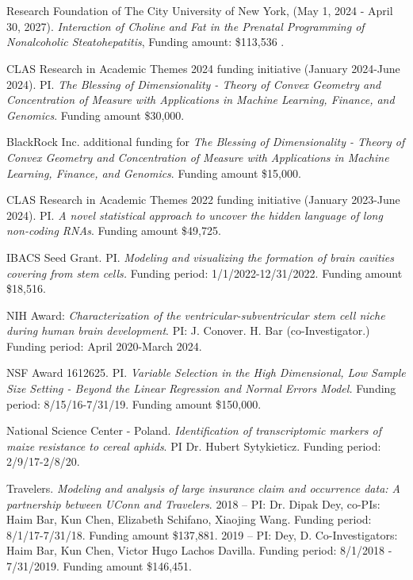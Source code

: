 \documentclass[12pt,a4paper]{article}
\newcommand{\headingfont}{\Large\color{OliveGreen}}
\newenvironment{list1}{
  \begin{list}{\ding{113}}{%
      \setlength{\itemsep}{0in}
      \setlength{\parsep}{0in} \setlength{\parskip}{0in}
      \setlength{\topsep}{0in} \setlength{\partopsep}{0in}
      \setlength{\leftmargin}{0.17in}}}{\end{list}}
\begin{document}
\section*{\sc{\headingfont Grants and Contracts}}
\begin{list1}
\item[-] Research Foundation of The City University of New York, (May 1, 2024 - April 30, 2027). \textit{Interaction of Choline and Fat in the Prenatal Programming of Nonalcoholic Steatohepatitis}, Funding amount: \$113,536 .
\item[-] CLAS Research in Academic Themes 2024 funding initiative (January 2024-June 2024). PI. \textit{The Blessing of Dimensionality - Theory of Convex Geometry and Concentration of Measure with Applications in Machine Learning, Finance, and Genomics}. Funding amount \$30,000.
\item[-] BlackRock Inc. additional funding for \textit{The Blessing of Dimensionality - Theory of Convex Geometry and Concentration of Measure with Applications in Machine Learning, Finance, and Genomics}. Funding amount \$15,000.

\item[-] CLAS Research in Academic Themes 2022 funding initiative (January 2023-June 2024). PI. \textit{A novel statistical approach to uncover the hidden language of long non-coding RNAs}. Funding amount \$49,725.
\item[-] IBACS Seed Grant. PI. \textit{Modeling and visualizing the formation of brain cavities covering from stem cells.} Funding period: 1/1/2022-12/31/2022. Funding amount \$18,516.
\item[-] NIH Award: \textit{Characterization of the ventricular-subventricular stem cell niche during human brain development}. 
PI: J. Conover. H. Bar (co-Investigator.) Funding period: April 2020-March 2024. %
\item[-] NSF Award  1612625. PI. \textit{Variable Selection in the High Dimensional, Low Sample Size Setting - Beyond the Linear Regression and Normal Errors Model.}
Funding period: 8/15/16-7/31/19. Funding amount \$150,000.
\item[-] National Science Center - Poland.
\textit{Identification of transcriptomic markers of maize resistance to cereal aphids}.
PI Dr. Hubert Sytykieticz.
Funding period: 2/9/17-2/8/20.
\item[-] Travelers.
\textit{Modeling and analysis of large insurance claim and occurrence data: A partnership between UConn and Travelers}. 2018 -- PI: Dr. Dipak Dey, co-PIs: Haim Bar, Kun Chen, Elizabeth Schifano, Xiaojing Wang.
Funding period: 8/1/17-7/31/18. Funding amount \$137,881.
2019 -- PI: Dey, D. Co-Investigators: Haim Bar, Kun Chen,  Victor
Hugo Lachos Davilla. Funding period: 8/1/2018 - 7/31/2019. Funding amount \$146,451.
 \end{list1}
\end{document}
